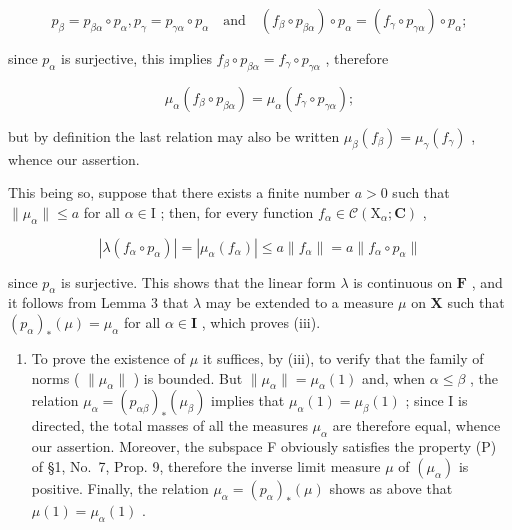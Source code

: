 \[
p _ {\beta} = p _ {\beta \alpha} \circ p _ {\alpha}, p _ {\gamma} = p _ {\gamma \alpha} \circ p _ {\alpha} \quad \text {and} \quad (f _ {\beta} \circ p _ {\beta \alpha}) \circ p _ {\alpha} = (f _ {\gamma} \circ p _ {\gamma \alpha}) \circ p _ {\alpha};
\]

since \(p_{\alpha}\) is surjective, this implies \(f_{\beta} \circ p_{\beta \alpha} = f_{\gamma} \circ p_{\gamma \alpha}\) , therefore

\[
\mu_ {\alpha} (f _ {\beta} \circ p _ {\beta \alpha}) = \mu_ {\alpha} (f _ {\gamma} \circ p _ {\gamma \alpha});
\]

but by definition the last relation may also be written \(\mu_{\beta}(f_{\beta}) = \mu_{\gamma}(f_{\gamma})\) , whence our assertion.

This being so, suppose that there exists a finite number \(a > 0\) such that \(\| \mu_{\alpha}\| \leqslant a\) for all \(\alpha \in \mathrm{I}\) ; then, for every function \(f_{\alpha} \in \mathcal{C}(\mathrm{X}_{\alpha};\mathbf{C})\) ,

\[
\left| \lambda (f _ {\alpha} \circ p _ {\alpha}) \right| = \left| \mu_ {\alpha} (f _ {\alpha}) \right| \leqslant a \| f _ {\alpha} \| = a \| f _ {\alpha} \circ p _ {\alpha} \|
\]

since \(p_{\alpha}\) is surjective. This shows that the linear form \(\lambda\) is continuous on \(\mathbf{F}\) , and it follows from Lemma 3 that \(\lambda\) may be extended to a measure \(\mu\) on \(\mathbf{X}\) such that \((p_{\alpha})_{*}(\mu) = \mu_{\alpha}\) for all \(\alpha \in \mathbf{I}\) , which proves (iii).

\begin{enumerate}
\def\labelenumi{(\roman{enumi})}
\setcounter{enumi}{3}
\tightlist
\item
  To prove the existence of \(\mu\) it suffices, by (iii), to verify that the family of norms ( \(\| \mu_{\alpha}\|\) ) is bounded. But \(\| \mu_{\alpha}\| = \mu_{\alpha}(1)\) and, when \(\alpha \leqslant \beta\) , the relation \(\mu_{\alpha} = (p_{\alpha \beta})_{*}(\mu_{\beta})\) implies that \(\mu_{\alpha}(1) = \mu_{\beta}(1)\) ; since I is directed, the total masses of all the measures \(\mu_{\alpha}\) are therefore equal, whence our assertion. Moreover, the subspace F obviously satisfies the property (P) of §1, No.~7, Prop. 9, therefore the inverse limit measure \(\mu\) of \((\mu_{\alpha})\) is positive. Finally, the relation \(\mu_{\alpha} = (p_{\alpha})_{*}(\mu)\) shows as above that \(\mu(1) = \mu_{\alpha}(1)\) .
\end{enumerate}

